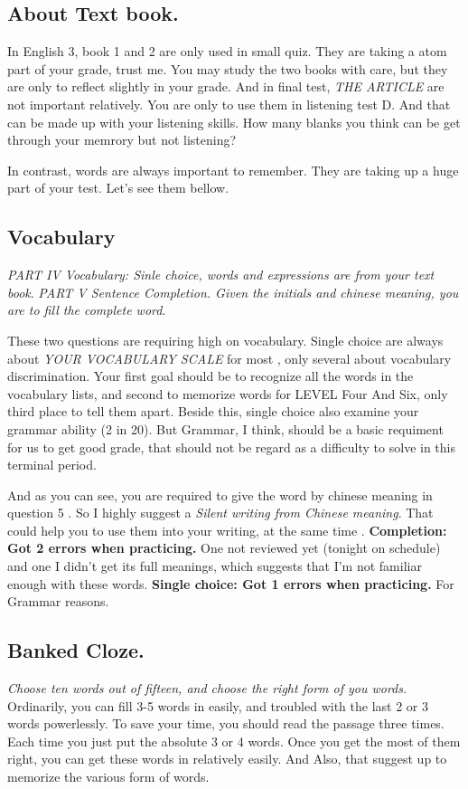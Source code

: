 \documentclass[10pt]{article}
\begin{document}
\subsection{About Text book.}
In English 3, book 1 and 2 are only used in small quiz. They are taking a atom part of your grade, trust me. You may study the two books with care, but they are only to reflect slightly in your grade. And in final test, \emph{THE ARTICLE } are not important relatively. You are only to use them in listening test D. And that can be made up with your listening skills. How many blanks you think can be get through your memrory but not listening?

In contrast, words are always important to remember. They are taking up a huge part of your test. Let's see them bellow.

\subsection{Vocabulary}
\emph{PART IV Vocabulary: Sinle choice, words and expressions are from your text book}. 
\emph{PART V Sentence Completion. Given the initials and chinese meaning, you are to fill the complete word}. \par
These two questions are requiring high on vocabulary. Single choice are always about \emph{YOUR VOCABULARY SCALE} for most , only several about vocabulary discrimination. Your first goal should be to recognize all the words in the vocabulary lists, and second to memorize words for LEVEL Four And Six, only third place to tell them apart.
Beside this, single choice also examine your grammar ability (2 in 20). But Grammar, I think, should be a basic requiment for us to get good grade, that should not be regard as a difficulty to solve in this terminal period.\par
And as you can see, you are required to give the word by chinese meaning in question 5 . So I highly suggest a \emph{Silent writing from Chinese meaning}. That could help you to use them into your writing, at the same time .
\textbf{Completion: Got 2 errors when practicing. } One not reviewed yet (tonight on schedule) and one I didn't get its full meanings, which suggests that I'm not familiar enough with these words. 
\textbf{Single choice: Got 1 errors when practicing. } For Grammar reasons.

\subsection{Banked Cloze. }
\emph{Choose ten words out of fifteen, and choose the right form of you words.} 
Ordinarily, you can fill 3-5 words in easily, and troubled with the last 2 or 3 words powerlessly. To save your time, you should read the passage three times. Each time you just put the absolute 3 or 4 words. Once you get the most of them right, you can get these words in relatively easily.
And Also, that suggest up to memorize the various form of words. 
\end{document}
